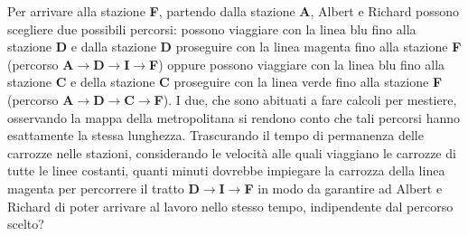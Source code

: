\documentclass[12pt]{matemaj}
\begin{document}
\vspace{-.8cm}
\quesito[1;24]
Per arrivare alla stazione {\bf F}, partendo dalla stazione {\bf A}, Albert e Richard possono scegliere due possibili percorsi: possono viaggiare con la linea blu fino alla stazione {\bf D} e dalla stazione {\bf D} proseguire con la linea magenta fino alla stazione {\bf F} (percorso {\bf A$\rightarrow$D$\rightarrow$I$\rightarrow$F}) oppure possono viaggiare con la linea blu fino alla stazione {\bf C} e della stazione {\bf C} proseguire con la linea verde fino alla stazione {\bf F} (percorso {\bf A$\rightarrow$D$\rightarrow$C$\rightarrow$F}). I due, che sono abituati a fare calcoli per mestiere, osservando la mappa della metropolitana si rendono conto che tali percorsi hanno esattamente la stessa lunghezza. Trascurando il tempo di permanenza delle carrozze nelle stazioni, considerando le velocità alle quali viaggiano le carrozze di tutte le linee costanti, quanti minuti dovrebbe impiegare la carrozza della linea magenta per percorrere il tratto {\bf D$\rightarrow$I$\rightarrow$F} in modo da garantire ad Albert e Richard di poter arrivare al lavoro nello stesso tempo, indipendente dal percorso scelto?
\end{document}
